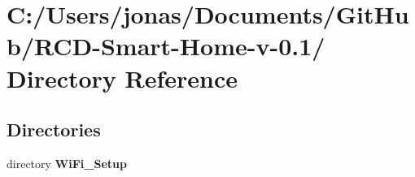 \section{C:/Users/jonas/Documents/Git\-Hub/RCD-Smart-Home-v-0.1/ Directory Reference}
\label{dir_C_3A_2FUsers_2Fjonas_2FDocuments_2FGitHub_2FRCD_2DSmart_2DHome_2Dv_2D0_2E1_2F}


\subsection*{Directories}
\begin{CompactItemize}
\item 
directory {\bf Wi\-Fi\_\-Setup}
\end{CompactItemize}
